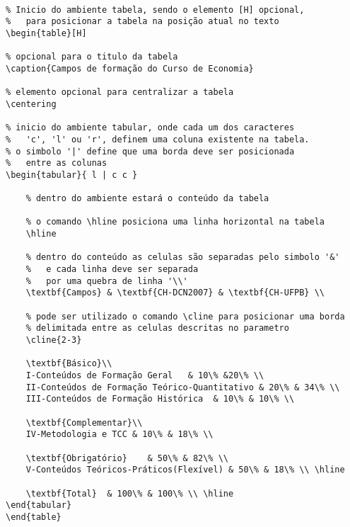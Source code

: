 \documentclass[12pt,a4paper]{article}
\begin{document}
\begin{BVerbatim}

\begin{table}[H]

\caption{Campos de formação do Curso de Economia}

\centering

\begin{tabular}{ l | c c }

	
	\hline
	
	\textbf{Campos} & \textbf{CH-DCN2007} & \textbf{CH-UFPB} \\
	
	\cline{2-3} 
	
	\textbf{Básico}\\  
	I-Conteúdos de Formação Geral 	& 10\% &20\% \\
	II-Conteúdos de Formação Teórico-Quantitativo & 20\% & 34\% \\
	III-Conteúdos de Formação Histórica  & 10\% & 10\% \\
	
	\textbf{Complementar}\\  
	IV-Metodologia e TCC & 10\% & 18\% \\
	
	\textbf{Obrigatório} 	& 50\% & 82\% \\ 
	V-Conteúdos Teóricos-Práticos(Flexível)	& 50\% & 18\% \\ \hline
	
	\textbf{Total} 	& 100\% & 100\% \\ \hline
\end{tabular}
\end{table}
\end{BVerbatim}
\\
\\
\\
\\
\end{document}
